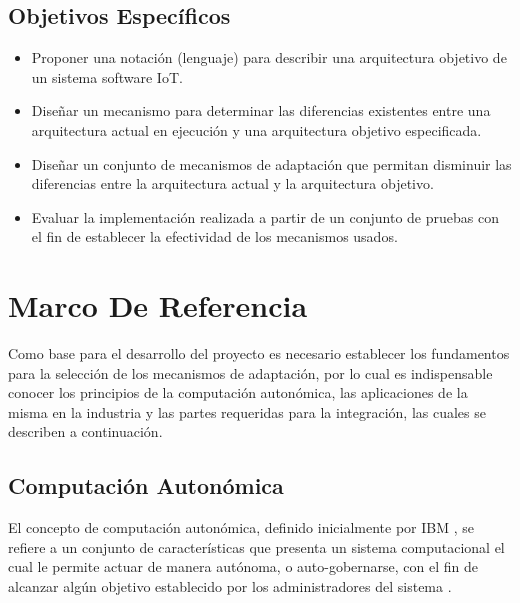 \documentclass[12pt]{article}
\begin{document}
    \subsection{Objetivos Específicos}

    \begin{itemize}
        \item Proponer una notación (lenguaje) para describir una arquitectura objetivo de un sistema software IoT.
        \item Diseñar un mecanismo para determinar las diferencias existentes entre una arquitectura actual en ejecución y una arquitectura objetivo especificada.
        \item Diseñar un conjunto de mecanismos de adaptación que permitan disminuir las diferencias entre la arquitectura actual y la arquitectura objetivo.
        \item Evaluar la implementación realizada a partir de un conjunto de pruebas con el fin de establecer la efectividad de los mecanismos usados.

    \end{itemize}

    \pagebreak

    \section{Marco De Referencia}

    Como base para el desarrollo del proyecto es necesario establecer los fundamentos para la selección de los mecanismos de adaptación, por lo cual es indispensable conocer los principios de la computación autonómica, las aplicaciones de la misma en la industria y las partes requeridas para la integración, las cuales se describen a continuación.

    \subsection{Computación Autonómica}
    

    El concepto de computación autonómica, definido inicialmente por IBM \citeyear{horn_2001}, se refiere a un conjunto de características que presenta un sistema computacional el cual le permite actuar de manera autónoma, o auto-gobernarse, con el fin de alcanzar algún objetivo establecido por los administradores del sistema \cite{lalanda_diaconescu_mccann_2014}.
\end{document}

